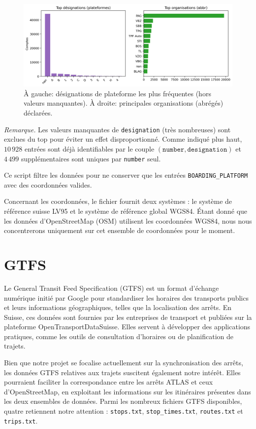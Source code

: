 \begin{figure}[h]
  \centering
  \includegraphics[width=.85\linewidth]{figures/plots/atlas_designation_operators.png}
  \caption[Désignations et opérateurs ATLAS]{À gauche: désignations de plateforme les plus fréquentes (hors valeurs manquantes). À droite: principales organisations (abrégés) déclarées.}
  \label{fig:atlas_distribs}
\end{figure}

\noindent\textit{Remarque.} Les valeurs manquantes de \texttt{designation} (très nombreuses) sont exclues du top pour éviter un effet disproportionné. Comme indiqué plus haut, \(10\,928\) entrées sont déjà identifiables par le couple \((\texttt{number},\texttt{designation})\) et \(4\,499\) supplémentaires sont uniques par \texttt{number} seul.

Ce script filtre les données pour ne conserver que les entrées \texttt{BOARDING\_PLATFORM} avec des coordonnées valides.

Concernant les coordonnées, le fichier fournit deux systèmes : le système de référence suisse LV95 et le système de référence global WGS84. Étant donné que les données d'OpenStreetMap (OSM) utilisent les coordonnées WGS84, nous nous concentrerons uniquement sur cet ensemble de coordonnées pour le moment.

\section{GTFS}

Le General Transit Feed Specification (GTFS) est un format d’échange numérique initié par Google pour standardiser les horaires des transports publics et leurs informations géographiques, telles que la localisation des arrêts. En Suisse, ces données sont fournies par les entreprises de transport et publiées sur la plateforme OpenTransportDataSuisse. Elles servent à développer des applications pratiques, comme les outils de consultation d’horaires ou de planification de trajets.

Bien que notre projet se focalise actuellement sur la synchronisation des arrêts, les données GTFS relatives aux trajets suscitent également notre intérêt. Elles pourraient faciliter la correspondance entre les arrêts ATLAS et ceux d’OpenStreetMap, en exploitant les informations sur les itinéraires présentes dans les deux ensembles de données. Parmi les nombreux fichiers GTFS disponibles, quatre retiennent notre attention : \texttt{stops.txt}, \texttt{stop\_times.txt}, \texttt{routes.txt} et \texttt{trips.txt}.

